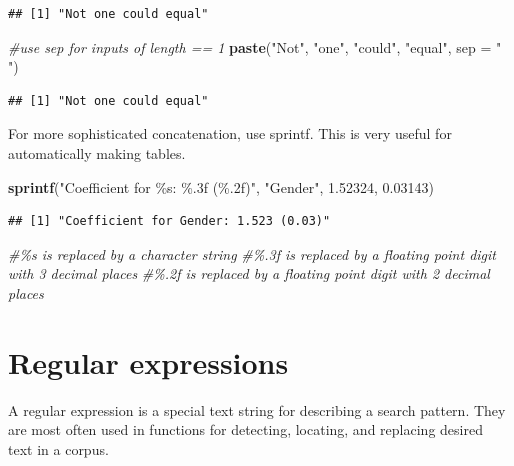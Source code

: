 \documentclass[
]{book}
\newenvironment{Shaded}{\begin{snugshade}}{\end{snugshade}}
\newcommand{\CommentTok}[1]{\textcolor[rgb]{0.56,0.35,0.01}{\textit{#1}}}
\newcommand{\DataTypeTok}[1]{\textcolor[rgb]{0.13,0.29,0.53}{#1}}
\newcommand{\FloatTok}[1]{\textcolor[rgb]{0.00,0.00,0.81}{#1}}
\newcommand{\KeywordTok}[1]{\textcolor[rgb]{0.13,0.29,0.53}{\textbf{#1}}}
\newcommand{\NormalTok}[1]{#1}
\newcommand{\StringTok}[1]{\textcolor[rgb]{0.31,0.60,0.02}{#1}}
\theoremstyle{definition}
\theoremstyle{definition}
\theoremstyle{definition}
\theoremstyle{remark}
\begin{document}
\begin{verbatim}
## [1] "Not one could equal"
\end{verbatim}

\begin{Shaded}
\begin{Highlighting}[]
\CommentTok{\#use sep for inputs of length == 1 }
\KeywordTok{paste}\NormalTok{(}\StringTok{"Not"}\NormalTok{, }\StringTok{"one"}\NormalTok{, }\StringTok{"could"}\NormalTok{, }\StringTok{"equal"}\NormalTok{, }\DataTypeTok{sep =} \StringTok{" "}\NormalTok{)}
\end{Highlighting}
\end{Shaded}

\begin{verbatim}
## [1] "Not one could equal"
\end{verbatim}

For more sophisticated concatenation, use sprintf. This is very useful for automatically making tables.

\begin{Shaded}
\begin{Highlighting}[]
\KeywordTok{sprintf}\NormalTok{(}\StringTok{"Coefficient for \%s: \%.3f (\%.2f)"}\NormalTok{, }\StringTok{"Gender"}\NormalTok{, }\FloatTok{1.52324}\NormalTok{, }\FloatTok{0.03143}\NormalTok{)}
\end{Highlighting}
\end{Shaded}

\begin{verbatim}
## [1] "Coefficient for Gender: 1.523 (0.03)"
\end{verbatim}

\begin{Shaded}
\begin{Highlighting}[]
\CommentTok{\#\%s is replaced by a character string}
\CommentTok{\#\%.3f is replaced by a floating point digit with 3 decimal places}
\CommentTok{\#\%.2f is replaced by a floating point digit with 2 decimal places}
\end{Highlighting}
\end{Shaded}

\hypertarget{regular-expressions}{%
\section{Regular expressions}\label{regular-expressions}}

A regular expression is a special text string for describing a search pattern.
They are most often used in functions for detecting, locating, and replacing desired text in a corpus.
\end{document}

